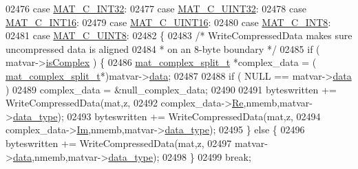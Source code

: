 \begin{DoxyCode}
{{{{{{{{{{{{{{{{02476         \textcolor{keywordflow}{case} \hyperlink{group___m_a_t_ggad4d60ae7b709fc81bfd744fb4c857c40adb44fc39694e3152ae5e69470a2fefe8}{MAT\_C\_INT32}:
02477         \textcolor{keywordflow}{case} \hyperlink{group___m_a_t_ggad4d60ae7b709fc81bfd744fb4c857c40a9a17a7edd45b19ef68197db81b27e816}{MAT\_C\_UINT32}:
02478         \textcolor{keywordflow}{case} \hyperlink{group___m_a_t_ggad4d60ae7b709fc81bfd744fb4c857c40a40370e9de516c5036a67a5865c071006}{MAT\_C\_INT16}:
02479         \textcolor{keywordflow}{case} \hyperlink{group___m_a_t_ggad4d60ae7b709fc81bfd744fb4c857c40a8bede21dbf6c1edc0bbccc1481bccae7}{MAT\_C\_UINT16}:
02480         \textcolor{keywordflow}{case} \hyperlink{group___m_a_t_ggad4d60ae7b709fc81bfd744fb4c857c40a984ff310f9e906100fcff95f704f43c5}{MAT\_C\_INT8}:
02481         \textcolor{keywordflow}{case} \hyperlink{group___m_a_t_ggad4d60ae7b709fc81bfd744fb4c857c40a81270f8093cb4808e992c1d29d84d4e3}{MAT\_C\_UINT8}:
02482         \{
02483             \textcolor{comment}{/* WriteCompressedData makes sure uncompressed data is aligned}
02484 \textcolor{comment}{             * on an 8-byte boundary */}
02485             \textcolor{keywordflow}{if} ( matvar->\hyperlink{group___m_a_t_aeb03b3a69f108dc05470b00443a43739}{isComplex} ) \{
02486                 \hyperlink{group___m_a_t_structmat__complex__split__t}{mat\_complex\_split\_t} *complex\_data = (
      \hyperlink{group___m_a_t_structmat__complex__split__t}{mat\_complex\_split\_t}*)matvar->\hyperlink{group___m_a_t_a5672978efa230bbdecdf38ede781f7fa}{data};
02487 
02488                 if ( NULL == matvar->\hyperlink{group___m_a_t_a5672978efa230bbdecdf38ede781f7fa}{data} )
02489                     complex\_data = &null\_complex\_data;
02490 
02491                 byteswritten += WriteCompressedData(mat,z,
02492                     complex\_data->\hyperlink{group___m_a_t_a484a93607508adac2bce53a0252e0325}{Re},nmemb,matvar->\hyperlink{group___m_a_t_ab6aafe9bd77f0f077852593dec438144}{data\_type});
02493                 byteswritten += WriteCompressedData(mat,z,
02494                     complex\_data->\hyperlink{group___m_a_t_a7182d10b0d3598415887376065440946}{Im},nmemb,matvar->\hyperlink{group___m_a_t_ab6aafe9bd77f0f077852593dec438144}{data\_type});
02495             \} \textcolor{keywordflow}{else} \{
02496                 byteswritten += WriteCompressedData(mat,z,
02497                     matvar->\hyperlink{group___m_a_t_a5672978efa230bbdecdf38ede781f7fa}{data},nmemb,matvar->\hyperlink{group___m_a_t_ab6aafe9bd77f0f077852593dec438144}{data\_type});
02498             \}
02499             \textcolor{keywordflow}{break};
}}}}}}}}}}}}}}}}
\end{DoxyCode}
